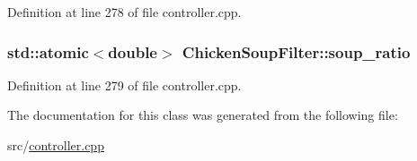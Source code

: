 Definition at line 278 of file controller.\+cpp.

\subsubsection[{\texorpdfstring{soup\+\_\+ratio}{soup_ratio}}]{\setlength{\rightskip}{0pt plus 5cm}std\+::atomic$<$double$>$ Chicken\+Soup\+Filter\+::soup\+\_\+ratio}\hypertarget{classChickenSoupFilter_a664d696a17a9037457ef27d4b118562c}{}\label{classChickenSoupFilter_a664d696a17a9037457ef27d4b118562c}


Definition at line 279 of file controller.\+cpp.



The documentation for this class was generated from the following file\+:\begin{DoxyCompactItemize}
\item 
src/\hyperlink{controller_8cpp}{controller.\+cpp}\end{DoxyCompactItemize}

